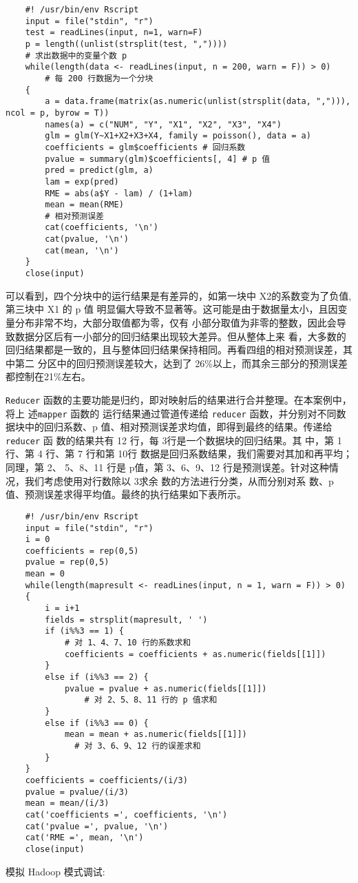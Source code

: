 \begin{lstlisting}
	#! /usr/bin/env Rscript
	input = file("stdin", "r")
	test = readLines(input, n=1, warn=F)
	p = length((unlist(strsplit(test, ","))))
	# 求出数据中的变量个数 p
	while(length(data <- readLines(input, n = 200, warn = F)) > 0)
	    # 每 200 行数据为一个分块
	{
	    a = data.frame(matrix(as.numeric(unlist(strsplit(data, ","))), ncol = p, byrow = T))
	    names(a) = c("NUM", "Y", "X1", "X2", "X3", "X4")
	    glm = glm(Y~X1+X2+X3+X4, family = poisson(), data = a)
	    coefficients = glm$coefficients # 回归系数
	    pvalue = summary(glm)$coefficients[, 4] # p 值
	    pred = predict(glm, a)
	    lam = exp(pred)
	    RME = abs(a$Y - lam) / (1+lam)
	    mean = mean(RME)
	    # 相对预测误差
	    cat(coefficients, '\n')
	    cat(pvalue, '\n')
	    cat(mean, '\n')
	}
	close(input)
\end{lstlisting}

可以看到，四个分块中的运行结果是有差异的，如第一块中 X2的系数变为了负值,第三块中 X1 的 p 值
明显偏大导致不显著等。这可能是由于数据量太小，且因变量分布非常不均，大部分取值都为零，仅有
小部分取值为非零的整数，因此会导致数据分区后有一小部分的回归结果出现较大差异。但从整体上来
看，大多数的回归结果都是一致的，且与整体回归结果保持相同。再看四组的相对预测误差，其中第二
分区中的回归预测误差较大，达到了 26\%以上，而其余三部分的预测误差都控制在21\%左右。

\lstinline!Reducer! 函数的主要功能是归约，即对映射后的结果进行合并整理。在本案例中，将上
述\lstinline!mapper! 函数的 运行结果通过管道传递给 \lstinline!reducer! 函数，并分别对不同数
据块中的回归系数、p 值、相对预测误差求均值，即得到最终的结果。传递给 \lstinline!reducer! 函
数的结果共有 12 行，每 3行是一个数据块的回归结果。其 中，第 1 行、第 4 行、第 7 行和第 10行
数据是回归系数结果，我们需要对其加和再平均；同理，第 2、 5、8、11 行是 p值，第 3、6、9、12
行是预测误差。针对这种情况，我们考虑使用对行数除以 3求余 数的方法进行分类，从而分别对系
数、p值、预测误差求得平均值。最终的执行结果如下表所示。

\begin{lstlisting}
	#! /usr/bin/env Rscript
	input = file("stdin", "r")
	i = 0
	coefficients = rep(0,5)
	pvalue = rep(0,5)
	mean = 0
	while(length(mapresult <- readLines(input, n = 1, warn = F)) > 0)
	{
	    i = i+1
	    fields = strsplit(mapresult, ' ')
	    if (i%%3 == 1) {
	        # 对 1、4、7、10 行的系数求和
	        coefficients = coefficients + as.numeric(fields[[1]])
	    }
	    else if (i%%3 == 2) {
	        pvalue = pvalue + as.numeric(fields[[1]])
	            # 对 2、5、8、11 行的 p 值求和
	    }
	    else if (i%%3 == 0) {
	        mean = mean + as.numeric(fields[[1]])
	          # 对 3、6、9、12 行的误差求和
	    }
	}
	coefficients = coefficients/(i/3)
	pvalue = pvalue/(i/3)
	mean = mean/(i/3)
	cat('coefficients =', coefficients, '\n')
	cat('pvalue =', pvalue, '\n')
	cat('RME =', mean, '\n')
	close(input)
\end{lstlisting}
模拟 Hadoop 模式调试:

